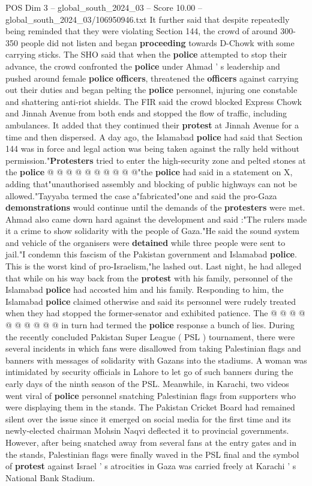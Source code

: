 \begin{textsample}{POS Dim 3 – global\_south\_2024\_03 – Score 10.00 – global\_south\_2024\_03/106950946.txt}
It further said that despite repeatedly being reminded that they were violating Section 144, the crowd of around 300-350 people did not listen and began \textbf{proceeding} towards D-Chowk with some carrying sticks.
The SHO said that when the \textbf{police} attempted to stop their advance, the crowd confronted the \textbf{police} under Ahmad ' s leadership and pushed around female \textbf{police} \textbf{officers}, threatened the \textbf{officers} against carrying out their duties and began pelting the \textbf{police} personnel, injuring one constable and shattering anti-riot shields.
The FIR said the crowd blocked Express Chowk and Jinnah Avenue from both ends and stopped the flow of traffic, including ambulances.
It added that they continued their \textbf{protest} at Jinnah Avenue for a time and then dispersed.
A day ago, the Islamabad \textbf{police} had said that Section 144 was in force and legal action was being taken against the rally held without permission."\textbf{Protesters} tried to enter the high-security zone and pelted stones at the \textbf{police} @ @ @ @ @ @ @ @ @ @"the \textbf{police} had said in a statement on X, adding that"unauthorised assembly and blocking of public highways can not be allowed."Tayyaba termed the case a"fabricated"one and said the pro-Gaza \textbf{demonstrations} would continue until the demands of the \textbf{protesters} were met.
Ahmad also came down hard against the development and said :"The rulers made it a crime to show solidarity with the people of Gaza."He said the sound system and vehicle of the organisers were \textbf{detained} while three people were sent to jail."I condemn this fascism of the Pakistan government and Islamabad \textbf{police}.
This is the worst kind of pro-Israelism,"he lashed out.
Last night, he had alleged that while on his way back from the \textbf{protest} with his family, personnel of the Islamabad \textbf{police} had accosted him and his family.
Responding to him, the Islamabad \textbf{police} claimed otherwise and said its personnel were rudely treated when they had stopped the former-senator and exhibited patience.
The @ @ @ @ @ @ @ @ @ @ in turn had termed the \textbf{police} response a bunch of lies.
During the recently concluded Pakistan Super League ( PSL ) tournament, there were several incidents in which fans were disallowed from taking Palestinian flags and banners with messages of solidarity with Gazans into the stadiums.
A woman was intimidated by security officials in Lahore to let go of such banners during the early days of the ninth season of the PSL.
Meanwhile, in Karachi, two videos went viral of \textbf{police} personnel snatching Palestinian flags from supporters who were displaying them in the stands.
The Pakistan Cricket Board had remained silent over the issue since it emerged on social media for the first time and its newly-elected chairman Mohsin Naqvi deflected it to provincial governments.
However, after being snatched away from several fans at the entry gates and in the stands, Palestinian flags were finally waved in the PSL final and the symbol of \textbf{protest} against Israel ' s atrocities in Gaza was carried freely at Karachi ' s National Bank Stadium.


\end{textsample}
